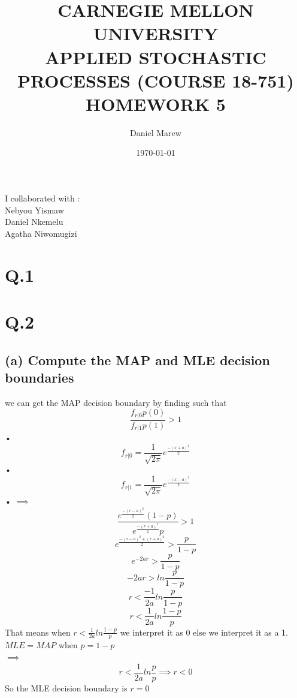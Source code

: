 \documentclass[a4paper,11pt]{article}
\begin{document}
\title{\color{red}CARNEGIE MELLON UNIVERSITY\\
APPLIED STOCHASTIC PROCESSES  (COURSE 18-751)\\
HOMEWORK 5}
\author{Daniel Marew}
\date{\today}
\clearpage\maketitle

\thispagestyle{empty}
\newpage
I collaborated with :\\
\hspace*{6cm}
Nebyou Yismaw\\
\hspace*{6cm}
Daniel    Nkemelu\\
\hspace*{6cm}
Agatha Niwomugizi
\thispagestyle{empty}
\newpage
\clearpage
\setcounter{page}{1}
\section*{Q.1}
\newpage
\clearpage
\section*{Q.2}
\subsection*{(a) Compute the MAP and MLE decision boundaries}
we can get the MAP decision boundary by finding such that 
\begin{equation}
\frac{f_{r|0}p(0)}{f_{r|1}p(1)}>1
\end{equation}• 
\begin{equation}
f_{r|0} = \frac{1}{\sqrt{2\pi}}e^\frac{-(x+a)^2}{2}
\end{equation}•
\begin{equation}
f_{r|1} = \frac{1}{\sqrt{2\pi}}e^\frac{-(x-a)^2}{2}
\end{equation}•
$\implies$
$$\frac{e^\frac{-(r-a)^2}{2}(1-p)}{e^\frac{-(r+a)^2}{2}p}>1$$
$$e^\frac{-(r-a)^2+(r+a)^2}{2}>\frac{p}{1-p}$$
$$e^{-2ar}>\frac{p}{1-p}$$
$$-2ar>ln\frac{p}{1-p}$$
$$r<\frac{-1}{2a}ln\frac{p}{1-p}$$
$$r<\frac{1}{2a}ln\frac{1-p}{p}$$
That means when $r<\frac{1}{2a}ln\frac{1-p}{p}$ we interpret it as 0 else we interpret it  as a 1.\\
$MLE = MAP$ when $p = 1-p$\\
$\implies$
$$r<\frac{1}{2a}ln\frac{p}{p}\implies r<0$$
So the MLE decision boundary is $r=0$
\clearpage
\newpage
\end{document}
